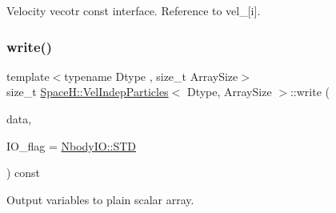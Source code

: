 Velocity vecotr const interface. Reference to vel\+\_\+\mbox{[}i\mbox{]}. 

\mbox{\label{class_space_h_1_1_vel_indep_particles_a29f0ab3b29eeabc746117ec2a759d8b1}} 
\subsubsection{\texorpdfstring{write()}{write()}}
{\footnotesize\ttfamily template$<$typename Dtype , size\+\_\+t Array\+Size$>$ \\
size\+\_\+t \mbox{\hyperlink{class_space_h_1_1_vel_indep_particles}{Space\+H\+::\+Vel\+Indep\+Particles}}$<$ Dtype, Array\+Size $>$\+::write (\begin{DoxyParamCaption}\item[{\mbox{\hyperlink{class_space_h_1_1_vel_indep_particles_abca40159a816385790d5a6fd19c1dc6d}{Scalar\+Buffer}} \&}]{data,  }\item[{const \mbox{\hyperlink{namespace_space_h_a296a8bae763a754564bfdce216e31b59}{Nbody\+IO}}}]{I\+O\+\_\+flag = {\ttfamily \mbox{\hyperlink{namespace_space_h_a296a8bae763a754564bfdce216e31b59ac6ce23be5d350ce18a665427d2d950f7}{Nbody\+I\+O\+::\+S\+TD}}} }\end{DoxyParamCaption}) const\hspace{0.3cm}{\ttfamily [inline]}}



Output variables to plain scalar array. 

